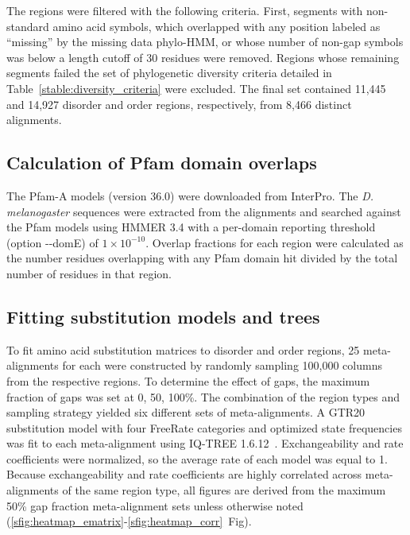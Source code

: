 The regions were filtered with the following criteria. First, segments with non-standard amino acid symbols, which overlapped with any position labeled as ``missing'' by the missing data phylo-HMM, or whose number of non-gap symbols was below a length cutoff of 30 residues were removed. Regions whose remaining segments failed the set of phylogenetic diversity criteria detailed in Table~\ref{stable:diversity_criteria} were excluded. The final set contained 11,445 and 14,927 disorder and order regions, respectively, from 8,466 distinct alignments.

\subsection{Calculation of Pfam domain overlaps}
The Pfam-A models (version 36.0) were downloaded from InterPro. The \textit{D. melanogaster} sequences were extracted from the alignments and searched against the Pfam models using HMMER 3.4 with a per-domain reporting threshold (option -{}-domE) of $1 \times 10^{-10}$. Overlap fractions for each region were calculated as the number residues overlapping with any Pfam domain hit divided by the total number of residues in that region.

\subsection{Fitting substitution models and trees}
To fit amino acid substitution matrices to disorder and order regions, 25 meta-alignments for each were constructed by randomly sampling 100,000 columns from the respective regions. To determine the effect of gaps, the maximum fraction of gaps was set at 0, 50, 100\%. The combination of the region types and sampling strategy yielded six different sets of meta-alignments. A GTR20 substitution model with four FreeRate categories and optimized state frequencies was fit to each meta-alignment using IQ-TREE 1.6.12~\cite{Nguyen2014}. Exchangeability and rate coefficients were normalized, so the average rate of each model was equal to 1. Because exchangeability and rate coefficients are highly correlated across meta-alignments of the same region type, all figures are derived from the maximum 50\% gap fraction meta-alignment sets unless otherwise noted (\ref{sfig:heatmap_ematrix}-\ref{sfig:heatmap_corr}~Fig).

